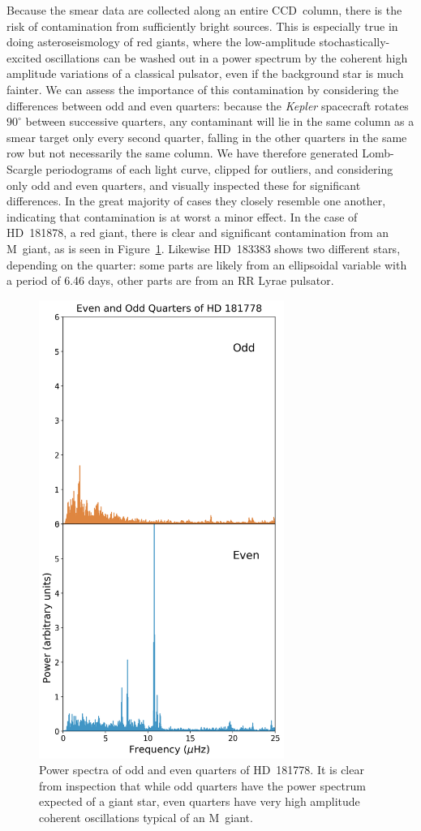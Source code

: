 \documentclass[a4paper,fleqn,usenatbib]{mnras}
\newcommand{\kepler}{\emph{Kepler}\xspace}
\begin{document}
Because the smear data are collected along an entire CCD~column, there is the risk of contamination from sufficiently bright sources. This is especially true in doing asteroseismology of red giants, where the low-amplitude stochastically-excited oscillations can be washed out in a power spectrum by the coherent high amplitude variations of a classical pulsator, even if the background star is much fainter. We can assess the importance of this contamination by considering the differences between odd and even quarters: because the \kepler spacecraft rotates $90^{\circ}$ between successive quarters, any contaminant will lie in the same column as a smear target only every second quarter, falling in the other quarters in the same row but not necessarily the same column. We have therefore generated Lomb-Scargle periodograms \citep{lomb,scargle} of each light curve, clipped for outliers, and considering only odd and even quarters, and visually inspected these for significant differences. In the great majority of cases they closely resemble one another, indicating that contamination is at worst a minor effect. In the case of HD~181878, a red giant, there is clear and significant contamination from an M~giant, as is seen in Figure~\ref{contamination}. Likewise HD~183383 shows two different stars, depending on the quarter: some parts are likely from an ellipsoidal variable with a period of 6.46 days, other parts are from an RR Lyrae pulsator.


\begin{figure}
\noindent\includegraphics[width=8cm,keepaspectratio]{contam_HD_181778.png}

\caption{\label{contamination}
Power spectra of odd and even quarters of HD~181778. It is clear from inspection that while odd quarters have the power spectrum expected of a giant star, even quarters have very high amplitude coherent oscillations typical of an M~giant.}
\end{figure}
\end{document}
